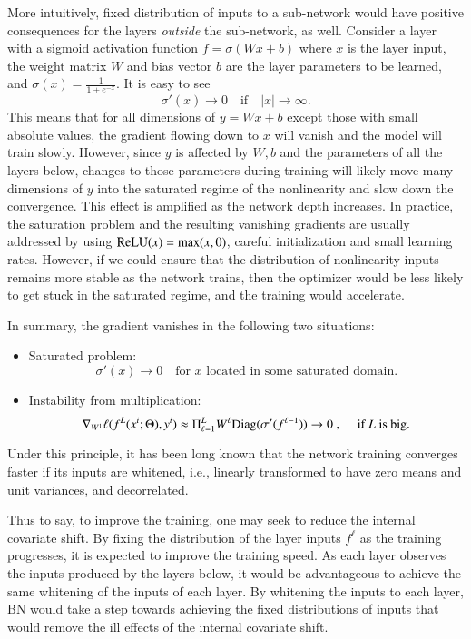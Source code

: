 More intuitively, fixed distribution of inputs to a sub-network would have positive
consequences for the layers {\em outside} the sub-network, as
well. Consider a layer with a sigmoid activation function $f =
\sigma(W x+b)$ where $x$ is the layer input, the weight matrix $W$ and
bias vector $b$ are the layer parameters to be learned, and $\sigma(x) =
\frac{1}{1+e^{-x}}$.  It is easy to see
$$
\sigma'(x) \to 0 \quad \text{if} \quad |x| \to \infty.
$$
This means that for all dimensions of $y = Wx+b$ except those with
small absolute values, the gradient flowing down to $x$ will vanish
and the model will train slowly. However, since $y$ is affected by
$W, b$ and the parameters of all the layers below, changes to those
parameters during training will likely move many dimensions of $y$
into the saturated regime of the nonlinearity and slow down the
convergence. This effect is amplified as the network depth
increases. In practice, the saturation problem and the resulting
vanishing gradients are usually addressed by using ${\rm ReLU}(x)=\max(x,0)$, careful initialization and small learning rates. 
However, if we could ensure that the distribution of nonlinearity inputs
remains more stable as the network trains, then the optimizer would be
less likely to get stuck in the saturated regime, and the training
would accelerate.

In summary, the gradient vanishes in the following two situations:
\begin{itemize}
	\item Saturated problem:
	$$
	\sigma'(x) \to 0 \quad \text{for $x$ located in some saturated domain}.
	$$
	\item Instability from multiplication:
	$$
	\nabla_{W^1}  \ell(f^L(x^i;\Theta), y^i) \approx \Pi_{\ell=1}^L W^{\ell} {\rm Diag}(\sigma'(f^{\ell-1})) \to 0~ , \quad \text{ if $L$ is big}.
	$$
\end{itemize}



Under this principle,  
it has been long known \cite{lecun1998neural, wiesler2011convergence}
that the network training converges faster if its inputs are whitened, i.e.,
linearly transformed to have zero means and unit variances, and  decorrelated. 

Thus to say, to improve the training,  one may seek to reduce the internal covariate shift.  
By fixing the distribution of the layer inputs $f^\ell$ as the training progresses,
it is expected to improve the training speed. As each layer
observes the inputs produced by the layers below, it would be advantageous to
achieve the same whitening of the inputs of each layer.  By whitening the
inputs to each layer, BN would take a step towards achieving the fixed
distributions of inputs that would remove the ill effects of the internal covariate shift. 


